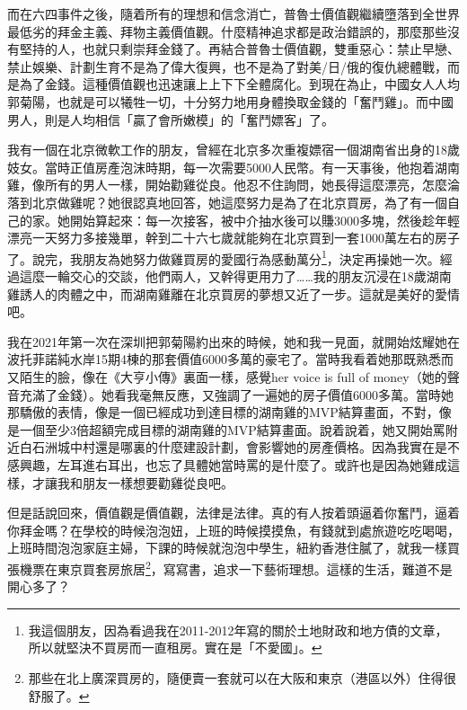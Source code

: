 而在六四事件之後，隨着所有的理想和信念消亡，普魯士價值觀繼續墮落到全世界最低劣的拜金主義、拜物主義價值觀。什麼精神追求都是政治錯誤的，那麼那些沒有堅持的人，也就只剩崇拜金錢了。再結合普魯士價值觀，雙重惡心：禁止早戀、禁止娛樂、計劃生育不是為了偉大復興，也不是為了對美/日/俄的復仇總體戰，而是為了金錢。這種價值觀也迅速讓上上下下全體腐化。到現在為止，中國女人人均郭菊陽，也就是可以犧牲一切，十分努力地用身體換取金錢的「奮鬥雞」。而中國男人，則是人均相信「贏了會所嫩模」的「奮鬥嫖客」了。

我有一個在北京微軟工作的朋友，曾經在北京多次重複嫖宿一個湖南省出身的18歲妓女。當時正值房產泡沫時期，每一次需要5000人民幣。有一天事後，他抱着湖南雞，像所有的男人一樣，開始勸雞從良。他忍不住詢問，她長得這麼漂亮，怎麼淪落到北京做雞呢？她很認真地回答，她這麼努力是為了在北京買房，為了有一個自己的家。她開始算起來：每一次接客，被中介抽水後可以賺3000多塊，然後趁年輕漂亮一天努力多接幾單，幹到二十六七歲就能夠在北京買到一套1000萬左右的房子了。說完，我朋友為她努力做雞買房的愛國行為感動萬分\footnote{我這個朋友，因為看過我在2011-2012年寫的關於土地財政和地方債的文章，所以就堅決不買房而一直租房。實在是「不愛國」。}，決定再操她一次。經過這麼一輪交心的交談，他們兩人，又幹得更用力了……我的朋友沉浸在18歲湖南雞誘人的肉體之中，而湖南雞離在北京買房的夢想又近了一步。這就是美好的愛情吧。

我在2021年第一次在深圳把郭菊陽約出來的時候，她和我一見面，就開始炫耀她在波托菲諾純水岸15期4棟的那套價值6000多萬的豪宅了。當時我看着她那既熟悉而又陌生的臉，像在《大亨小傳》裏面一樣，感覺her voice is full of money（她的聲音充滿了金錢）。她看我毫無反應，又強調了一遍她的房子價值6000多萬。當時她那驕傲的表情，像是一個已經成功到達目標的湖南雞的MVP結算畫面，不對，像是一個至少3倍超額完成目標的湖南雞的MVP結算畫面。說着說着，她又開始罵附近白石洲城中村還是哪裏的什麼建設計劃，會影響她的房產價格。因為我實在是不感興趣，左耳進右耳出，也忘了具體她當時罵的是什麼了。或許也是因為她雞成這樣，才讓我和朋友一樣想要勸雞從良吧。

但是話說回來，價值觀是價值觀，法律是法律。真的有人按着頭逼着你奮鬥，逼着你拜金嗎？在學校的時候泡泡妞，上班的時候摸摸魚，有錢就到處旅遊吃吃喝喝，上班時間泡泡家庭主婦，下課的時候就泡泡中學生，紐約香港住膩了，就我一樣買張機票在東京買套房旅居\footnote{那些在北上廣深買房的，隨便賣一套就可以在大阪和東京（港區以外）住得很舒服了。}，寫寫書，追求一下藝術理想。這樣的生活，難道不是開心多了？
